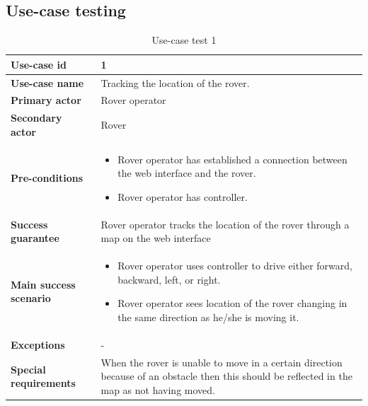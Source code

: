 \documentclass[12pt]{article}
\begin{document}
	\subsection{Use-case testing}
		\begin{table}[H]
		\centering
		\begin{tabularx}{\linewidth}{|X|X|}
			\hline
			\textbf{Use-case id} &1\\
			\hline
			\textbf{Use-case name} &Tracking the location of the rover.\\
			\hline
			\textbf{Primary actor} &Rover operator\\
			\hline
			\textbf{Secondary actor} &Rover\\
			\hline
			\textbf{Pre-conditions} &\begin{itemize}
										\item Rover operator has established a connection between the web interface and the rover.
										\item Rover operator has controller.
									\end{itemize}\\
			\hline
			\textbf{Success guarantee} &Rover operator tracks the location of the rover through a map on the web interface\\
			\hline
			\textbf{Main success scenario} &\begin{itemize}
												\item Rover operator uses controller to drive either forward, backward, left, or right.
												\item Rover operator sees location of the rover changing in the same direction as he/she is moving it.
											\end{itemize}\\
			\hline
			\textbf{Exceptions} &-\\
			\hline
			\textbf{Special requirements} &When the rover is unable to move in a certain direction because of an obstacle then this should be reflected in the map as not having moved.\\
			\hline
		\end{tabularx}
		\caption{Use-case test 1}
		\label{table:Use-case test 1}   
	\end{table}
\end{document}
